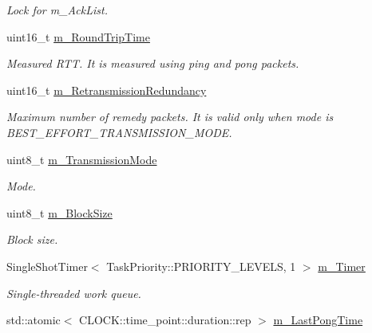 \begin{DoxyCompactItemize}
\begin{DoxyCompactList}\small\item\em Lock for m\+\_\+\+Ack\+List. \end{DoxyCompactList}\item 
uint16\+\_\+t \hyperlink{class_network_coding_1_1_transmission_session_a7888abd5fd616a2cf7d9953b570b492c}{m\+\_\+\+Round\+Trip\+Time}
\begin{DoxyCompactList}\small\item\em Measured R\+TT. It is measured using ping and pong packets. \end{DoxyCompactList}\item 
uint16\+\_\+t \hyperlink{class_network_coding_1_1_transmission_session_a3b8bbbaab2050d0c5a47ecec913bada4}{m\+\_\+\+Retransmission\+Redundancy}
\begin{DoxyCompactList}\small\item\em Maximum number of remedy packets. It is valid only when mode is B\+E\+S\+T\+\_\+\+E\+F\+F\+O\+R\+T\+\_\+\+T\+R\+A\+N\+S\+M\+I\+S\+S\+I\+O\+N\+\_\+\+M\+O\+DE. \end{DoxyCompactList}\item 
uint8\+\_\+t \hyperlink{class_network_coding_1_1_transmission_session_affd2b90f3eb8788d1a2228a0293ebbcf}{m\+\_\+\+Transmission\+Mode}
\begin{DoxyCompactList}\small\item\em Mode. \end{DoxyCompactList}\item 
uint8\+\_\+t \hyperlink{class_network_coding_1_1_transmission_session_a262e1ebcc22845e897947ddb5713c71b}{m\+\_\+\+Block\+Size}
\begin{DoxyCompactList}\small\item\em Block size. \end{DoxyCompactList}\item 
Single\+Shot\+Timer$<$ Task\+Priority\+::\+P\+R\+I\+O\+R\+I\+T\+Y\+\_\+\+L\+E\+V\+E\+LS, 1 $>$ \hyperlink{class_network_coding_1_1_transmission_session_a73487485091c27671139faa56b28ac2a}{m\+\_\+\+Timer}
\begin{DoxyCompactList}\small\item\em Single-\/threaded work queue. \end{DoxyCompactList}\item 
std\+::atomic$<$ C\+L\+O\+C\+K\+::time\+\_\+point\+::duration\+::rep $>$ \hyperlink{class_network_coding_1_1_transmission_session_abb6d66fd378f02bb7147e9b0faca7fd5}{m\+\_\+\+Last\+Pong\+Time}\hypertarget{class_network_coding_1_1_transmission_session_abb6d66fd378f02bb7147e9b0faca7fd5}{}\label{class_network_coding_1_1_transmission_session_abb6d66fd378f02bb7147e9b0faca7fd5}


\end{DoxyCompactItemize}
